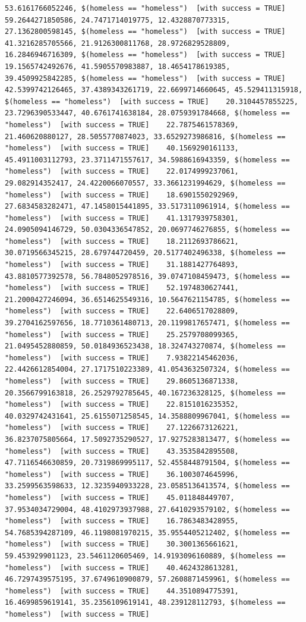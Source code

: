 \documentclass{tufte-book}\usepackage[]{graphicx}\usepackage[]{xcolor}
\makeatletter
\newenvironment{kframe}{%
 \def\at@end@of@kframe{}%
 \ifinner\ifhmode%
  \def\at@end@of@kframe{\end{minipage}}%
  \begin{minipage}{\columnwidth}%
 \fi\fi%
 \def\FrameCommand##1{\hskip\@totalleftmargin \hskip-\fboxsep
 \colorbox{shadecolor}{##1}\hskip-\fboxsep
     \hskip-\linewidth \hskip-\@totalleftmargin \hskip\columnwidth}%
 \MakeFramed {\advance\hsize-\width
   \@totalleftmargin\z@ \linewidth\hsize
   \@setminipage}}%
 {\par\unskip\endMakeFramed%
 \at@end@of@kframe}
\newenvironment{knitrout}{}{} %
\makeatother
\begin{document}
\begin{knitrout}
\begin{kframe}
\begin{verbatim}
53.6161766052246, $(homeless == "homeless")  [with success = TRUE]    59.2644271850586, 24.7471714019775, 12.4328870773315, 27.1362800598145, $(homeless == "homeless")  [with success = TRUE]    41.3216285705566, 21.9126300811768, 28.9726829528809, 16.2846946716309, $(homeless == "homeless")  [with success = TRUE]    19.1565742492676, 41.5905570983887, 18.4654178619385, 39.4509925842285, $(homeless == "homeless")  [with success = TRUE]    42.5399742126465, 37.4389343261719, 22.6699714660645, 45.529411315918, $(homeless == "homeless")  [with success = TRUE]    20.3104457855225, 23.7296390533447, 40.6761741638184, 28.0759391784668, $(homeless == "homeless")  [with success = TRUE]    22.7875461578369, 21.460620880127, 28.5055770874023, 33.6529273986816, $(homeless == "homeless")  [with success = TRUE]    40.1569290161133, 45.4911003112793, 23.3711471557617, 34.5988616943359, $(homeless == "homeless")  [with success = TRUE]    22.0174999237061, 29.082914352417, 24.4220066070557, 33.3661231994629, $(homeless == "homeless")  [with success = TRUE]    18.6901550292969, 27.6834583282471, 47.1458015441895, 33.5173110961914, $(homeless == "homeless")  [with success = TRUE]    41.1317939758301, 24.0905094146729, 50.0304336547852, 20.0697746276855, $(homeless == "homeless")  [with success = TRUE]    18.2112693786621, 30.0719566345215, 28.679744720459, 20.5177402496338, $(homeless == "homeless")  [with success = TRUE]    31.1881427764893, 43.8810577392578, 56.7848052978516, 39.0747108459473, $(homeless == "homeless")  [with success = TRUE]    52.1974830627441, 21.2000427246094, 36.6514625549316, 10.5647621154785, $(homeless == "homeless")  [with success = TRUE]    22.6406517028809, 39.2704162597656, 18.7710361480713, 20.1199817657471, $(homeless == "homeless")  [with success = TRUE]    25.2579708099365, 21.0495452880859, 50.0184936523438, 18.324743270874, $(homeless == "homeless")  [with success = TRUE]    7.93822145462036, 22.4426612854004, 27.1717510223389, 41.0543632507324, $(homeless == "homeless")  [with success = TRUE]    29.8605136871338, 20.3566799163818, 26.2529792785645, 40.167236328125, $(homeless == "homeless")  [with success = TRUE]    22.8151016235352, 40.0329742431641, 25.6155071258545, 14.3588809967041, $(homeless == "homeless")  [with success = TRUE]    27.1226673126221, 36.8237075805664, 17.5092735290527, 17.9275283813477, $(homeless == "homeless")  [with success = TRUE]    43.3535842895508, 47.7116546630859, 20.7319869995117, 52.4558448791504, $(homeless == "homeless")  [with success = TRUE]    36.1003074645996, 33.2599563598633, 12.3235940933228, 23.0585136413574, $(homeless == "homeless")  [with success = TRUE]    45.011848449707, 37.9534034729004, 48.4102973937988, 27.6410293579102, $(homeless == "homeless")  [with success = TRUE]    16.7863483428955, 54.7685394287109, 46.1198081970215, 35.9554405212402, $(homeless == "homeless")  [with success = TRUE]    30.3001365661621, 59.453929901123, 23.5461120605469, 14.9193096160889, $(homeless == "homeless")  [with success = TRUE]    40.4624328613281, 46.7297439575195, 37.6749610900879, 57.2608871459961, $(homeless == "homeless")  [with success = TRUE]    44.3510894775391, 16.4699859619141, 35.2356109619141, 48.239128112793, $(homeless == "homeless")  [with success = TRUE]    
\end{verbatim}
\end{kframe}
\end{knitrout}
\end{document}
